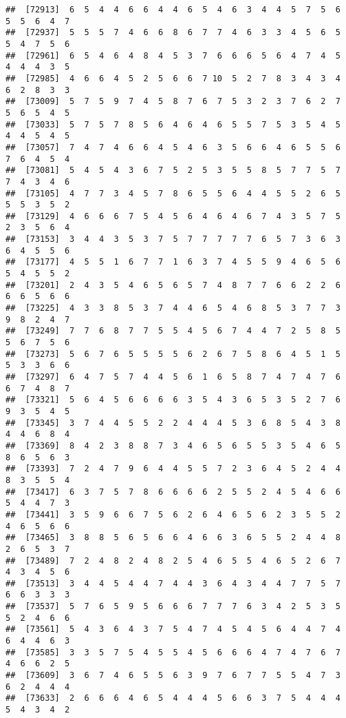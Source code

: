 \documentclass[
]{book}
\begin{document}
\begin{verbatim}
##  [72913]  6  5  4  4  6  6  4  4  6  5  4  6  3  4  4  5  7  5  6  5  5  6  4  7
##  [72937]  5  5  5  7  4  6  6  8  6  7  7  4  6  3  3  4  5  6  5  5  4  7  5  6
##  [72961]  6  5  4  6  4  8  4  5  3  7  6  6  6  5  6  4  7  4  5  4  4  4  3  5
##  [72985]  4  6  6  4  5  2  5  6  6  7 10  5  2  7  8  3  4  3  4  6  2  8  3  3
##  [73009]  5  7  5  9  7  4  5  8  7  6  7  5  3  2  3  7  6  2  7  5  6  5  4  5
##  [73033]  5  7  5  7  8  5  6  4  6  4  6  5  5  7  5  3  5  4  5  4  4  5  4  5
##  [73057]  7  4  7  4  6  6  4  5  4  6  3  5  6  6  4  6  5  5  6  7  6  4  5  4
##  [73081]  5  4  5  4  3  6  7  5  2  5  3  5  5  8  5  7  7  5  7  7  4  3  4  6
##  [73105]  4  7  7  3  4  5  7  8  6  5  5  6  4  4  5  5  2  6  5  5  5  3  5  2
##  [73129]  4  6  6  6  7  5  4  5  6  4  6  4  6  7  4  3  5  7  5  2  3  5  6  4
##  [73153]  3  4  4  3  5  3  7  5  7  7  7  7  7  6  5  7  3  6  3  6  4  5  5  6
##  [73177]  4  5  5  1  6  7  7  1  6  3  7  4  5  5  9  4  6  5  6  5  4  5  5  2
##  [73201]  2  4  3  5  4  6  5  6  5  7  4  8  7  7  6  6  2  2  6  6  6  5  6  6
##  [73225]  4  3  3  8  5  3  7  4  4  6  5  4  6  8  5  3  7  7  3  9  8  2  4  7
##  [73249]  7  7  6  8  7  7  5  5  4  5  6  7  4  4  7  2  5  8  5  5  6  7  5  6
##  [73273]  5  6  7  6  5  5  5  5  6  2  6  7  5  8  6  4  5  1  5  5  3  3  6  6
##  [73297]  6  4  7  5  7  4  4  5  6  1  6  5  8  7  4  7  4  7  6  6  7  4  8  7
##  [73321]  5  6  4  5  6  6  6  6  3  5  4  3  6  5  3  5  2  7  6  9  3  5  4  5
##  [73345]  3  7  4  4  5  5  2  2  4  4  4  5  3  6  8  5  4  3  8  4  4  6  8  4
##  [73369]  8  4  2  3  8  8  7  3  4  6  5  6  5  5  3  5  4  6  5  8  6  5  6  3
##  [73393]  7  2  4  7  9  6  4  4  5  5  7  2  3  6  4  5  2  4  4  8  3  5  5  4
##  [73417]  6  3  7  5  7  8  6  6  6  6  2  5  5  2  4  5  4  6  6  5  4  4  7  3
##  [73441]  3  5  9  6  6  7  5  6  2  6  4  6  5  6  2  3  5  5  2  4  6  5  6  6
##  [73465]  3  8  8  5  6  5  6  6  4  6  6  3  6  5  5  2  4  4  8  2  6  5  3  7
##  [73489]  7  2  4  8  2  4  8  2  5  4  6  5  5  4  6  5  2  6  7  4  3  4  5  6
##  [73513]  3  4  4  5  4  4  7  4  4  3  6  4  3  4  4  7  7  5  7  6  6  3  3  3
##  [73537]  5  7  6  5  9  5  6  6  6  7  7  7  6  3  4  2  5  3  5  5  2  4  6  6
##  [73561]  5  4  3  6  4  3  7  5  4  7  4  5  4  5  6  4  4  7  4  6  4  4  6  3
##  [73585]  3  3  5  7  5  4  5  5  4  5  6  6  6  4  7  4  7  6  7  4  6  6  2  5
##  [73609]  3  6  7  4  6  5  5  6  3  9  7  6  7  7  5  5  4  7  3  6  2  4  4  4
##  [73633]  2  6  6  6  4  6  5  4  4  4  5  6  6  3  7  5  4  4  4  5  4  3  4  2

\end{verbatim}
\end{document}
